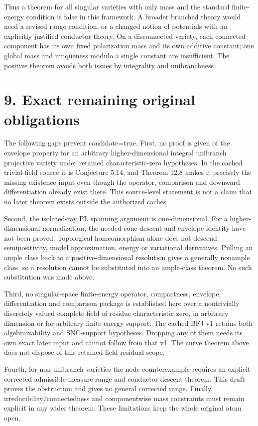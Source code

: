 \documentclass[11pt]{article}
\begin{document}
Thus a theorem for all singular varieties with only mass and the standard finite-energy condition is false in this framework. A broader branched theory would need a revised range condition, or a changed notion of potentials with an explicitly justified conductor theory. On a disconnected variety, each connected component has its own fixed polarization mass and its own additive constant; one global mass and uniqueness modulo a single constant are insufficient. The positive theorem avoids both issues by integrality and unibranchness.

\section*{9. Exact remaining original obligations}
The following gaps prevent candidate=true. First, no proof is given of the envelope property for an arbitrary higher-dimensional integral unibranch projective variety under retained characteristic-zero hypotheses. In the cached trivial-field source it is Conjecture 5.14, and Theorem 12.8 makes it precisely the missing existence input even though the operator, comparison and downward differentiation already exist there. This source-level statement is not a claim that no later theorem exists outside the authorized caches.

Second, the isolated-ray PL spanning argument is one-dimensional. For a higher-dimensional normalization, the needed cone descent and envelope identity have not been proved. Topological homeomorphism alone does not descend semipositivity, model approximation, energy or variational derivatives. Pulling an ample class back to a positive-dimensional resolution gives a generally nonample class, so a resolution cannot be substituted into an ample-class theorem. No such substitution was made above.

Third, no singular-space finite-energy operator, compactness, envelope, differentiation and comparison package is established here over a nontrivially discretely valued complete field of residue characteristic zero, in arbitrary dimension or for arbitrary finite-energy support. The cached BFJ v1 retains both algebraizability and SNC-support hypotheses. Dropping any of them needs its own exact later input and cannot follow from that v1. The curve theorem above does not dispose of this retained-field residual scope.

Fourth, for non-unibranch varieties the node counterexample requires an explicit corrected admissible-measure range and conductor descent theorem. This draft proves the obstruction and gives no general corrected range. Finally, irreducibility/connectedness and componentwise mass constraints must remain explicit in any wider theorem. These limitations keep the whole original atom open.
\end{document}

